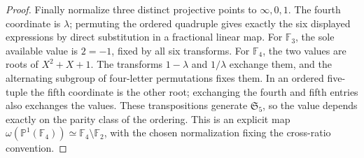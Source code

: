 \begin{proof}
Finally normalize three distinct projective points to $\infty,0,1$.
The fourth coordinate is $\lambda$; permuting the ordered quadruple
gives exactly the six displayed expressions by direct substitution in a
fractional linear map. For $\mathbb F_3$, the sole available value is
$2=-1$, fixed by all six transforms. For $\mathbb F_4$, the two values
are roots of $X^2+X+1$. The transforms $1-\lambda$ and $1/\lambda$
exchange them, and the alternating subgroup of four-letter permutations
fixes them. In an ordered five-tuple the fifth coordinate is the other
root; exchanging the fourth and fifth entries also exchanges the values.
These transpositions generate $\mathfrak S_5$, so the value depends
exactly on the parity class of the ordering. This is an explicit map
$\omega(\mathbb P^1(\mathbb F_4))\simeq\mathbb F_4\setminus\mathbb F_2$,
with the chosen normalization fixing the cross-ratio convention.
\end{proof}
